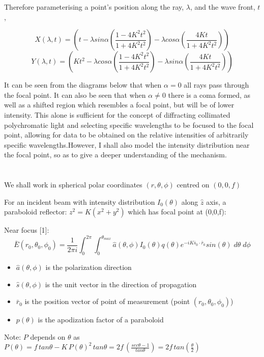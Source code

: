 \documentclass{article}
\begin{document}
    Therefore parameterising a point's position along the ray, \(\lambda\), and the wave front, \(t\),

    \[X(\lambda,t) = \left(t-\lambda sin\alpha \left(\frac{1-4K^2t^2}{1+4K^2t^2}\right) - \lambda cos\alpha \left(\frac{4Kt}{1+4K^2t^2}\right)\right)\]
    \[Y(\lambda,t) = \left(Kt^2-\lambda cos\alpha \left(\frac{1-4K^2t^2}{1+4K^2t^2}\right) - \lambda sin\alpha \left(\frac{4Kt}{1+4K^2t^2}\right)\right)\]

    It can be seen from the diagrams below that when \(\alpha = 0\) all rays pass through the focal point. It can also be seen that when \(\alpha \neq 0\) there is a coma formed, as well as a shifted region which resembles a focal point, but will be of lower intensity. This alone is sufficient for the concept of diffracting collimated polychromatic light and selecting specific wavelengths to be focused to the focal point, allowing for data to be obtained on the relative intensities of arbitrarily specific wavelengths.However, I shall also model the intensity distribution near the focal point, so as to give a deeper understanding of the mechanism.\\ 
    \\
    \\

    We shall work in spherical polar coordinates  \( (r,\theta , \phi) \) centred on \( (0,0,f) \)

    For an incident beam with intensity distribution \(I_0(\theta ) \) along \(\hat{z}\) axis, a paraboloid reflector: \(z^2 = K(x^2+y^2)\) which has focal point at (0,0,f):
    
    Near focus [1]:
    \[ \bar{E}(r_0,\theta_0 ,\phi_0 ) = \frac{1}{2\pi i} \int_0^{2 \pi } \int_0^{\theta_{max}} \hat{a} (\theta , \phi) I_0(\theta) q(\theta) e^{-i K \bar{s}_0 \cdot \bar{r}_0} sin(\theta) \; {d\theta} \; {d\phi} \]
    \begin{itemize}
	\item \( \hat{a}   (\theta , \phi) \) is the polarization direction
	\item \( \hat{s} (\theta , \phi) \) is the unit vector in the direction of propagation
	\item \( \bar{r}_0 \) is the position vector of point of measurement (point \( (r_0, \theta_0 , \phi_0)\))
	\item \( p(\theta) \) is the apodization factor of a paraboloid
    \end{itemize}

    Note: \(P\) depends on \(\theta\) as \( P(\theta) = f \, tan \theta - K \, P(\theta)^2 \, tan \theta = 2f \, \left(\frac{sec \theta - 1}{tan \theta}\right) = 2f \, tan\left(\frac{\theta}{2}\right)\)
\end{document}
